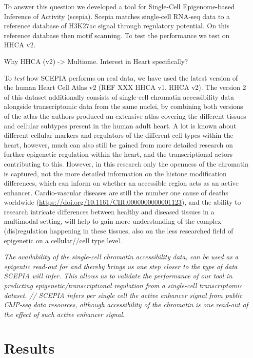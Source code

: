 To answer this question we developed a tool for Single-Cell Epigenome-based Inference of Activity (scepia). Scepia matches single-cell RNA-seq data to a reference database of H3K27ac signal through regulatory potential. On this reference database then motif scanning. To test the performance we test on HHCA v2. 

Why HHCA (v2) -> Multiome. Interest in Heart specifically?

To \textit{test} how SCEPIA performs on real data, we have used the latest version of the human Heart Cell Atlas v2 (REF XXX HHCA v1, HHCA v2). The version 2 of this dataset additionally consists of single-cell chromatin accessibility data alongside transcriptomic data from the same nuclei, by combining both versions of the atlas the authors produced an extensive atlas covering the different tissues and cellular subtypes present in the human adult heart. A lot is known about different cellular markers and regulators of the different cell types within the heart, however, much can also still be gained from more detailed research on further epigenetic regulation within the heart, and the transcriptional actors contributing to this. However, in this research only the openness of the chromatin is captured, not the more detailed information on the histone modification differences, which can inform on whether an accessible region acts as an active enhancer. Cardio-vascular diseases are still the number one cause of deaths worldwide (\href{https://doi.org/10.1161/CIR.0000000000001123}{https://doi.org/10.1161/CIR.0000000000001123}), and the ability to research intricate differences between healthy and diseased tissues in a multimodal setting, will help to gain more understanding of the complex (dis)regulation happening in these tissues, also on the less researched field of epigenetic on a cellular//cell type level. 

\textit{The availability of the single-cell chromatin accessibility data, can be used as a epigentic read-out for and thereby brings us one step closer to the type of data SCEPIA will infer. This allows us to validate the performance of our tool in predicting epigenetic/transcriptional regulation from a single-cell transcriptomic dataset. // SCEPIA infers per single cell the active enhancer signal from public ChIP-seq data resources, although accessibility of the chromatin is one read-out of the effect of such active enhancer signal.}

\section{Results}

